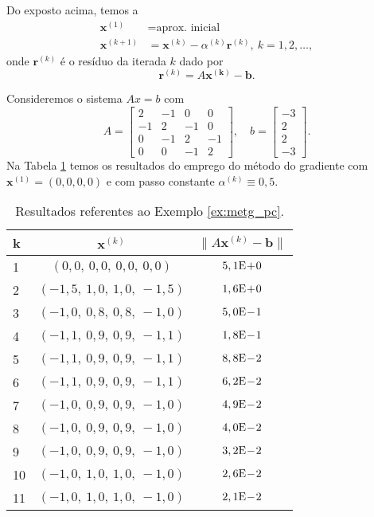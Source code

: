 Do exposto acima, temos a 
\begin{align}
  \pmb{x}^{(1)} &= \text{aprox. inicial}\\
  \pmb{x}^{(k+1)} &= \pmb{x}^{(k)} - \alpha^{(k)}\pmb{r}^{(k)},~k=1, 2, \ldots,
\end{align}
onde $\pmb{r}^{(k)}$ é o resíduo da iterada $k$ dado por
\begin{equation}
  \pmb{r}^{(k)} = A\pmb{x^{(k)}}-\pmb{b}.
\end{equation}

\begin{ex}\label{ex:metg_pc}
  Consideremos o sistema $Ax = b$ com
  \begin{equation}
    A =
    \begin{bmatrix}
      2 & -1 & 0 & 0\\
      -1 & 2 & -1 & 0\\
      0 & -1 & 2 & -1 \\
      0 & 0 & -1 & 2
    \end{bmatrix},\quad
    b =
    \begin{bmatrix}
      -3\\
      2\\
      2\\
      -3
    \end{bmatrix}.
  \end{equation}
  Na Tabela \ref{tab:metg_pc} temos os resultados do emprego do método do gradiente com $\pmb{x}^{(1)} = (0, 0, 0, 0)$ e com passo constante $\alpha^{(k)}\equiv 0,5$.

  \begin{table}[h!]
    \centering
    \caption{Resultados referentes ao Exemplo \ref{ex:metg_pc}.}
    \label{tab:metg_pc}
    \begin{tabular}{l|c|c}
      k & $\pmb{x}^{(k)}$ & $\|A\pmb{x}^{(k)}-\pmb{b}\|$\\\hline
      1 & $(0,0,~0,0,~0,0,~0,0)$ & $5,1\mathrm{E}\!+\!0$\\
      2 & $(-1,5,~1,0,~1,0,~-1,5)$ & $1,6\mathrm{E}\!+\!0$\\
      3 & $(-1,0,~0,8,~0,8,~-1,0)$ & $5,0\mathrm{E}\!-\!1$\\
      4 & $(-1,1,~0,9,~0,9,~-1,1)$ & $1,8\mathrm{E}\!-\!1$\\
      5 & $(-1,1,~0,9,~0,9,~-1,1)$ & $8,8\mathrm{E}\!-\!2$\\
      6 & $(-1,1,~0,9,~0,9,~-1,1)$ & $6,2\mathrm{E}\!-\!2$\\
      7 & $(-1,0,~0,9,~0,9,~-1,0)$ & $4,9\mathrm{E}\!-\!2$\\
      8 & $(-1,0,~0,9,~0,9,~-1,0)$ & $4,0\mathrm{E}\!-\!2$\\
      9 & $(-1,0,~0,9,~0,9,~-1,0)$ & $3,2\mathrm{E}\!-\!2$\\
      10 & $(-1,0,~1,0,~1,0,~-1,0)$ & $2,6\mathrm{E}\!-\!2$\\
      11 & $(-1,0,~1,0,~1,0,~-1,0)$ & $2,1\mathrm{E}\!-\!2$\\\hline
    \end{tabular}
  \end{table}


\end{ex}

